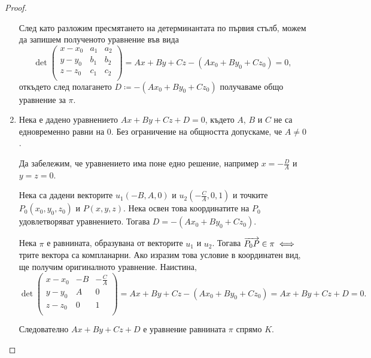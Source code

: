 \documentclass[numbers=endperiod, DIV=15]{scrartcl}
\begin{document}
\begin{proof}
\begin{enumerate}
    След като разложим пресмятането на детерминантата по първия стълб, можем да запишем полученото уравнение във вида
    \begin{displaymath}
      \det \begin{pmatrix}
        x - x_0 & a_1 & a_2 \\
        y - y_0 & b_1 & b_2 \\
        z - z_0 & c_1 & c_2 \\
      \end{pmatrix}
      =
      Ax + By + Cz - (Ax_0 + By_0 + Cz_0) = 0,
    \end{displaymath}
    откъдето след полагането $D \coloneqq - (Ax_0 + By_0 + Cz_0)$ получаваме общо уравнение за $\pi$.

    \item Нека е дадено уравнението $Ax + By + Cz + D = 0$, където $A$, $B$ и $C$ не са едновременно равни на $0$. Без ограничение на общността допускаме, че $A \neq 0$.

    Да забележим, че уравнението има поне едно решение, например $x = -\frac D A$ и $y = z = 0$.

    Нека са дадени векторите $u_1(-B, A, 0)$ и $u_2 \left(-\frac C A, 0, 1 \right)$ и точките $P_0(x_0, y_0, z_0)$ и $P(x, y, z)$. Нека освен това координатите на $P_0$ удовлетворяват уравнението. Тогава $D = -(Ax_0 + By_0 + Cz_0)$.

    Нека $\pi$ е равнината, образувана от векторите $u_1$ и $u_2$. Тогава $\overrightarrow{P_0 P} \in \pi \iff$ трите вектора са компланарни. Ако изразим това условие в координатен вид, ще получим оригиналното уравнение. Наистина,
    \begin{displaymath}
      \det \begin{pmatrix}
        x - x_0 & -B & -\frac C A \\
        y - y_0 & A & 0 \\
        z - z_0 & 0 & 1 \\
      \end{pmatrix}
      =
      Ax + By + Cz - (Ax_0 + By_0 + Cz_0) = Ax + By + Cz + D = 0.
    \end{displaymath}

    Следователно $Ax + By + Cz + D$ е уравнение равнината $\pi$ спрямо $K$.
  \end{enumerate}
\end{proof}
\end{document}
